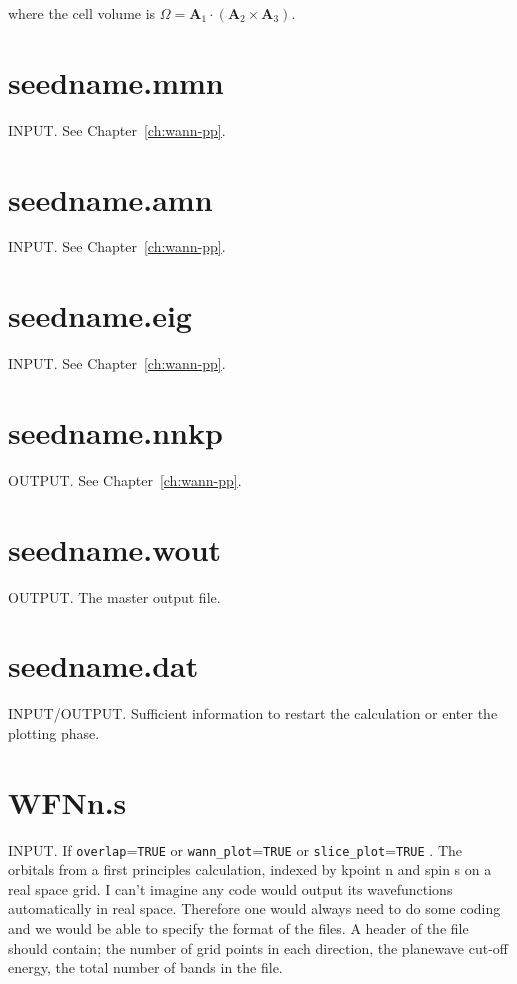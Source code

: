 where the cell volume is
$\Omega=\mathbf{A}_{1}\cdot(\mathbf{A}_{2}\times\mathbf{A}_{3})$.

\section{seedname.mmn}
INPUT. See Chapter~\ref{ch:wann-pp}.

\section{seedname.amn}
INPUT. See Chapter~\ref{ch:wann-pp}.

\section{seedname.eig}
INPUT. See Chapter~\ref{ch:wann-pp}.

\section{seedname.nnkp} \label{sec:old-nnkp}
OUTPUT. See Chapter~\ref{ch:wann-pp}.

\section{seedname.wout}
OUTPUT. The master output file.


\section{seedname.dat}
INPUT/OUTPUT. Sufficient information to restart the calculation or enter the
plotting phase.

\section{WFNn.s}
INPUT. If \verb#overlap#=\verb#TRUE# or \verb#wann_plot#=\verb#TRUE# or \verb#slice_plot#=\verb#TRUE# 
. The orbitals from a first
principles calculation, indexed by kpoint n and spin s on a real space
grid. I can't imagine any code would output its wavefunctions
automatically in real space. Therefore one would always need to do
some coding and we would be able to specify the format of the files. A
header of the file should contain; the number of grid points in each
direction, the planewave cut-off energy, the total number of bands in
the file.






